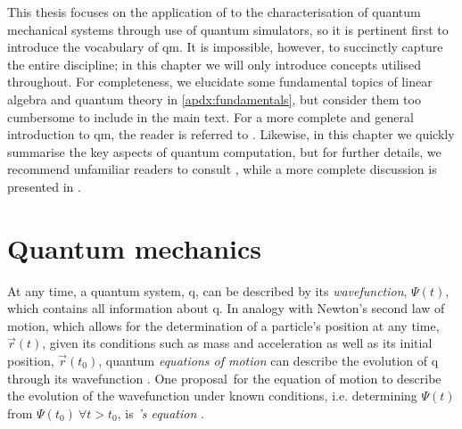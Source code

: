 \glsresetall
\par 
This thesis focuses on the application of  to the characterisation of quantum mechanical systems
    through use of quantum simulators, 
    so it is pertinent first to introduce the vocabulary of \gls{qm}. 
It is impossible, however, to succinctly capture the entire discipline; 
    in this chapter we will only introduce concepts utilised throughout.
For completeness, we elucidate some fundamental topics of linear algebra and quantum theory in \cref{apdx:fundamentals},
    but consider them too cumbersome to include in the main text. 
For a more complete and general introduction to \gls{qm}, the reader is referred to \cite{griffiths2018introduction, susskind2014quantum}.
Likewise, in this chapter we quickly summarise the key aspects of quantum computation, 
    but for further details, we recommend unfamiliar readers to consult \cite{rieffel2011quantum}, 
    while a more complete discussion is presented in \cite{nielsen2002quantum}.

\section{Quantum mechanics}\label{sec:qm}

At any time, a quantum system, \gls{q}, can be described by its \emph{wavefunction}, $\Psi(t)$, 
    which contains all information about \gls{q}. 
In analogy with Newton's second law of motion, 
    which allows for the determination of a particle's position at any time, $\vec{r}(t)$, 
    given its conditions such as mass and acceleration as well as its initial position, $\vec{r}(t_0)$,  
    quantum \emph{equations of motion} can describe the evolution of \gls{q} through its wavefunction \cite{dirac1981principles}. 
One proposal\footnotemark \ for the equation of motion 
    to describe the evolution of the wavefunction under known conditions, 
    i.e. determining $\Psi(t)$ from $\Psi(t_0) \ \forall t > t_0$, 
    is \emph{\schrodinger's equation}  \cite{griffiths2018introduction, mart2020introduce, nelson1966derivation}.
\par 

